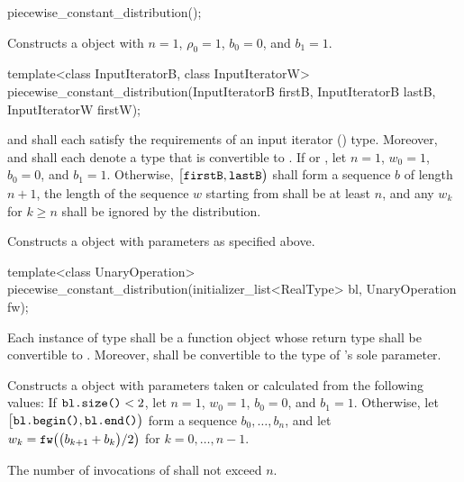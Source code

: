 %
\begin{itemdecl}
piecewise_constant_distribution();
\end{itemdecl}

\begin{itemdescr}
\pnum\effects Constructs a  object
 with $n = 1$,
 $\rho_0 = 1$,
 $b_0 = 0$,
 and $b_1 = 1$.
\end{itemdescr}


%
\begin{itemdecl}
template<class InputIteratorB, class InputIteratorW>
 piecewise_constant_distribution(InputIteratorB firstB, InputIteratorB lastB,
                                 InputIteratorW firstW);
\end{itemdecl}

\begin{itemdescr}
\pnum\requires
   and 
  shall each satisfy the requirements
  of an input iterator () type.
  Moreover,
   and
  shall each denote a type that is convertible to .
 If 
 or ,
 let $n = 1$,
     $w_0 = 1$,
     $b_0 = 0$,
 and $b_1 = 1$.
 Otherwise,
 $\bigl[\texttt{firstB}, \texttt{lastB}\bigr)$
 shall form a sequence $b$ of length $n+1$,
 the length of the sequence $w$ starting from 
 shall be at least $n$,
 and any $w_k$ for  $k \geq n$ shall be ignored by the distribution.

\pnum\effects Constructs a  object
 with parameters as specified above.
\end{itemdescr}


%
\begin{itemdecl}
template<class UnaryOperation>
 piecewise_constant_distribution(initializer_list<RealType> bl, UnaryOperation fw);
\end{itemdecl}

\begin{itemdescr}
\pnum\requires
 Each instance of type 
 shall be a function object
 whose return type shall be convertible to .
 Moreover,
  shall be convertible
 to the type of 's sole parameter.

\pnum\effects Constructs a  object
 with parameters taken or calculated
 from the following values:
 If $\texttt{bl.size()} < 2$,
 let $n = 1$,
     $w_0 = 1$,
     $b_0 = 0$,
 and $b_1 = 1$.
 Otherwise,
 let $\bigl[\texttt{bl.begin()}, \texttt{bl.end()}\bigr)$
 form a sequence $b_0, \dotsc, b_n$,
 and
 let $w_k = \texttt{fw}\bigl(\bigl(b_{k+1} + b_k\bigr) / 2\bigr)$
 for $k = 0, \dotsc, n - 1$.

\pnum\complexity
 The number of invocations of  shall not exceed $n$.
\end{itemdescr}


